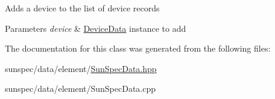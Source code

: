 Adds a device to the list of device records 
\begin{DoxyParams}{Parameters}
{\em device} & {\ttfamily \hyperlink{structsunspec_1_1data_1_1_device_data}{Device\+Data}} instance to add \\
\hline
\end{DoxyParams}


The documentation for this class was generated from the following files\+:\begin{DoxyCompactItemize}
\item 
sunspec/data/element/\hyperlink{_sun_spec_data_8hpp}{Sun\+Spec\+Data.\+hpp}\item 
sunspec/data/element/Sun\+Spec\+Data.\+cpp\end{DoxyCompactItemize}

